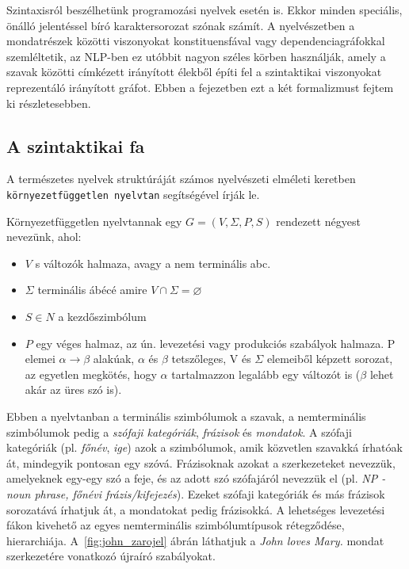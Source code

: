 Szintaxisról beszélhetünk programozási nyelvek esetén is. Ekkor minden speciális, önálló jelentéssel bíró karaktersorozat szónak számít.
A nyelvészetben a mondatrészek közötti viszonyokat konstituensfával vagy dependenciagráfokkal szemléltetik, az NLP-ben ez utóbbit nagyon széles körben használják, amely a szavak közötti címkézett irányított élekből építi fel a szintaktikai viszonyokat reprezentáló irányított gráfot. Ebben a fejezetben ezt a két formalizmust fejtem ki részletesebben.

\subsection{A szintaktikai fa}
\label{sec:tree}

A természetes nyelvek struktúráját számos nyelvészeti elméleti keretben \texttt{környezetfüggetlen nyelvtan} segítségével írják le.

Környezetfüggetlen nyelvtannak egy $G=(V,\Sigma ,P,S)$ rendezett négyest nevezünk, ahol:

\begin{itemize}
	\item \emph{$V$} s változók halmaza, avagy a nem terminális abc.
	\item \emph{$\Sigma$} terminális ábécé amire $ V \cap \Sigma =\varnothing $
	\item \emph{$S \in N$} a kezdőszimbólum
	\item \emph{$P$} egy véges halmaz, az ún. levezetési vagy produkciós szabályok halmaza. P elemei
$\alpha \to \beta$ alakúak, $\alpha$ és $\beta$ tetszőleges, V és $\Sigma$ elemeiből képzett sorozat, az egyetlen
megkötés, hogy $\alpha$ tartalmazzon legalább egy változót is ($\beta$ lehet akár az üres szó is).
\end{itemize}
\cite{Friedl:2003}
Ebben a nyelvtanban a terminális szimbólumok a szavak, a nemterminális szimbólumok pedig a \textit{szófaji kategóriák}, \textit{frázisok} és \textit{mondatok}. A szófaji kategóriák (pl. \textit{főnév}, \textit{ige}) azok a szimbólumok, amik közvetlen szavakká írhatóak át, mindegyik pontosan egy szóvá. Frázisoknak azokat a szerkezeteket nevezzük, amelyeknek egy-egy szó a feje, és az adott szó szófajáról nevezzük el (pl. \textit{NP - noun phrase, főnévi frázis/kifejezés}). Ezeket szófaji kategóriák és más frázisok sorozatává írhatjuk át, a mondatokat pedig frázisokká.
A lehetséges levezetési fákon kivehető az egyes nemterminális szimbólumtípusok rétegződése, hierarchiája.  A~\ref{fig:john_zarojel} ábrán láthatjuk a \textit{John loves Mary.} mondat szerkezetére vonatkozó újraíró szabályokat.


